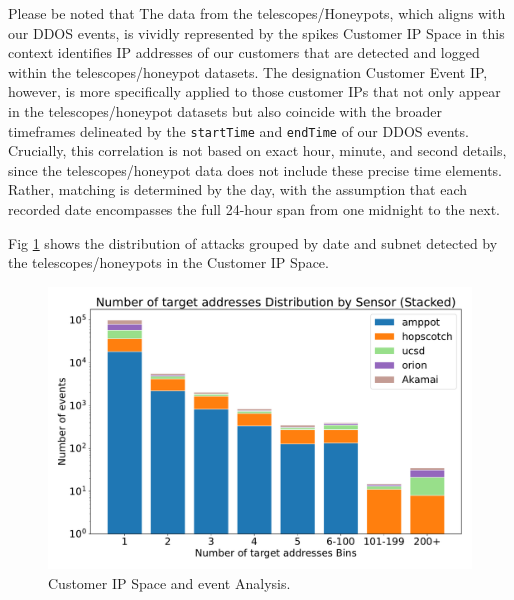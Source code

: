 Please be noted that The data from the telescopes/Honeypots, which aligns with our DDOS events, is vividly represented by the spikes Customer IP Space in this context identifies IP addresses of our customers that are detected and logged within the telescopes/honeypot datasets. 
The designation Customer Event IP, however, is more specifically applied to those customer IPs that not only appear in the telescopes/honeypot datasets but also coincide with the broader timeframes delineated by the \texttt{startTime} and \texttt{endTime} of our DDOS events. Crucially, this correlation is not based on exact hour, minute, and second details, since the telescopes/honeypot data does not include these precise time elements. Rather, matching is determined by the day, with the assumption that each recorded date encompasses the full 24-hour span from one midnight to the next.

Fig \ref{fig:akamai_spikes} shows the distribution of attacks grouped by date and subnet detected by the telescopes/honeypots in the Customer IP Space.
\begin{figure}[htbp]
    \centering
    \includegraphics[scale=0.48]{graphs/bins.pdf}
    \caption{Customer IP Space and event Analysis.}
    \label{fig:akamai_spikes}
\end{figure}